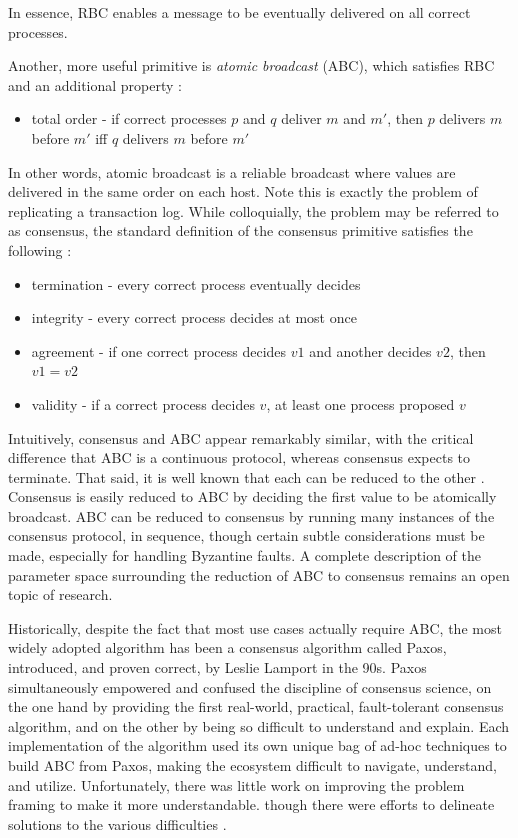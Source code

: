 In essence, RBC enables a message to be eventually delivered on all correct processes.

Another, more useful primitive is \emph{atomic broadcast} (ABC), 
which satisfies RBC and an additional property \cite{chandra1996unreliable}:

\begin{itemize}
\item total order - if correct processes $p$ and $q$ deliver $m$ and $m'$, then $p$ delivers $m$ before $m'$ iff $q$ delivers $m$ before $m'$
\end{itemize}

In other words, atomic broadcast is a reliable broadcast where values are delivered in the same order on each host. 
Note this is exactly the problem of replicating a transaction log.
While colloquially, the problem may be referred to as consensus, 
the standard definition of the consensus primitive satisfies the following \cite{chandra1996unreliable}:
\begin{itemize}
\item termination - every correct process eventually decides
\item integrity - every correct process decides at most once
\item agreement - if one correct process decides $v1$ and another decides $v2$, then $v1=v2$
\item validity - if a correct process decides $v$, at least one process proposed $v$
\end{itemize}

Intuitively, consensus and ABC appear remarkably similar, 
with the critical difference that ABC is a continuous protocol,
whereas consensus expects to terminate.
That said, it is well known that each can be reduced to the other \cite{chandra1996unreliable}.
Consensus is easily reduced to ABC by deciding the first value to be atomically broadcast.
ABC can be reduced to consensus by running many instances of the consensus protocol, 
in sequence, 
though certain subtle considerations must be made, 
especially for handling Byzantine faults.
A complete description of the parameter space surrounding
the reduction of ABC to consensus remains an open topic of research.

Historically, despite the fact that most use cases actually require ABC,
the most widely adopted algorithm has been a consensus algorithm called Paxos, 
introduced, and proven correct, by Leslie Lamport in the 90s.
Paxos simultaneously empowered and confused the discipline of consensus science,
on the one hand by providing the first real-world, practical, fault-tolerant consensus algorithm,
and on the other by being so difficult to understand and explain.
Each implementation of the algorithm used its own unique bag of ad-hoc techniques
to build ABC from Paxos, making the ecosystem difficult to navigate, understand, and utilize.
Unfortunately, there was little work on improving the problem framing to make it more understandable.
though there were efforts to delineate solutions to the various difficulties \cite{chandra2007paxos}.

